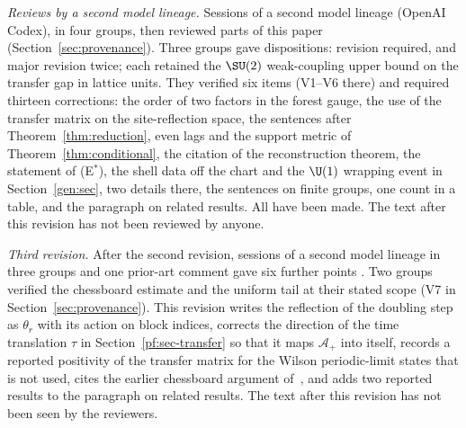 \emph{Reviews by a second model lineage.} Sessions of a second model lineage (OpenAI Codex), in four groups, then reviewed parts of this paper (Section~\ref{sec:provenance}). Three groups gave dispositions: revision required, and major revision twice; each retained the $\SU(2)$ weak-coupling upper bound on the transfer gap in lattice units. They verified six items (V1--V6 there) and required thirteen corrections: the order of two factors in the forest gauge, the use of the transfer matrix on the site-reflection space, the sentences after Theorem~\ref{thm:reduction}, even lags and the support metric of Theorem~\ref{thm:conditional}, the citation of the reconstruction theorem, the statement of (E$^*$), the shell data off the chart and the $\U(1)$ wrapping event in Section~\ref{gen:sec}, two details there, the sentences on finite groups, one count in a table, and the paragraph on related results. All have been made. The text after this revision has not been reviewed by anyone.

\emph{Third revision.} After the second revision, sessions of a second model lineage in three groups and one prior-art comment gave six further points \cite[comments 7105946691, 7105949912, 7105972084, 7106157462, 7106175581]{RepoThread}. Two groups verified the chessboard estimate and the uniform tail at their stated scope (V7 in Section~\ref{sec:provenance}). This revision writes the reflection of the doubling step as $\theta_r$ with its action on block indices, corrects the direction of the time translation $\tau$ in Section~\ref{pf:sec-transfer} so that it maps $\mathcal A_+$ into itself, records a reported positivity of the transfer matrix for the Wilson periodic-limit states that is not used, cites the earlier chessboard argument of~\cite{BhattEtAl26}, and adds two reported results to the paragraph on related results. The text after this revision has not been seen by the reviewers.
